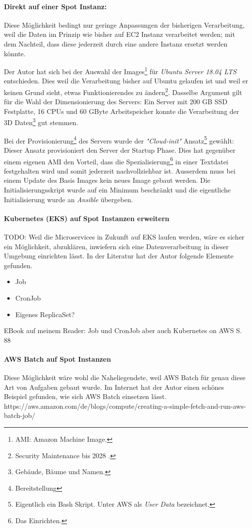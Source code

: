 \paragraph{Direkt auf einer Spot Instanz:}
Diese Möglichkeit bedingt nur geringe Anpassungen der bisherigen Verarbeitung, weil die Daten im Prinzip wie bisher auf EC2 Instanz verarbeitet werden; mit dem Nachteil, dass diese jederzeit durch eine andere Instanz ersetzt werden könnte.

Der Autor hat sich bei der Auswahl der Images\footnote{AMI: Amazon Machine Image.} für \emph{Ubuntu Server 18.04 LTS} entschieden. Dies weil die Verarbeitung bisher auf Ubuntu gelaufen ist und weil er keinen Grund sieht, etwas Funktionierendes zu ändern\footnote{Security Maintenance bis 2028 \cite{Ubuntu2020}.}. Dasselbe Argument gilt für die Wahl der Dimensionierung des Servers: Ein Server mit 200 GB SSD Festplatte, 16 CPUs und 60 GByte Arbeitspeicher konnte die Verarbeitung der 3D Daten\footnote{Gebäude, Bäume und Namen.} gut stemmen.

Bei der Provisionierung\footnote{Bereitstellung} des Servers wurde der \emph{"Cloud-init"} Ansatz\footnote{Eigentlich ein Bash Skript. Unter AWS als \emph{User Data} bezeichnet.} gewählt: Dieser Ansatz provisioniert den Server der Startup Phase. Dies hat gegenüber einem eigenen AMI den Vorteil, dass die Spezialisierung\footnote{Das Einrichten.} in einer Textdatei festgehalten wird und somit jederzeit nachvollziehbar ist. Ausserdem muss bei einem Update des Basis Images kein neues Image gebaut werden.
Die Initialisierungsskript wurde auf ein Minimum beschränkt und die eigentliche Initialisierung wurde an \emph{Ansible} übergeben. 

\paragraph{Kubernetes (EKS) auf Spot Instanzen erweitern}
TODO: Weil die Microservices in Zukunft auf EKS laufen werden, wäre es sicher ein Möglichkeit, abzuklären, inwiefern sich eine Datenverarbeitung in dieser Umgebung einrichten lässt. In der Literatur hat der Autor folgende Elemente gefunden.

\begin{itemize}
\item Job
\item CronJob
\item Eigenes ReplicaSet?
\end{itemize}

EBook auf meinem Reader: Job und CronJob aber auch Kubernetes on AWS S. 88

\paragraph{AWS Batch auf Spot Instanzen}
Diese Möglichkeit wäre wohl die Naheliegendste, weil AWS Batch für genau diese Art von Aufgaben gebaut wurde. Im Internet hat der Autor einen schönes Beispiel gefunden, wie sich AWS Batch einsetzen lässt.
https://aws.amazon.com/de/blogs/compute/creating-a-simple-fetch-and-run-aws-batch-job/
